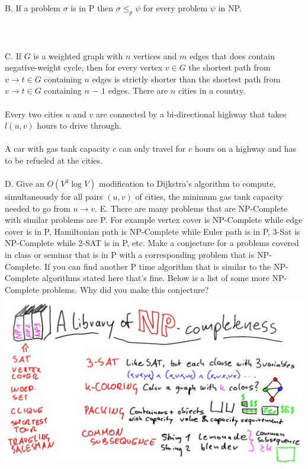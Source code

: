 \documentclass[12pt]{article}
\begin{document}
B. If a problem $\sigma$ is in P then $\sigma \le_p \psi$ for every problem $\psi$ in NP.\\\\\\\\
C. If $G$ is a weighted graph with $n$ vertices and $m$ edges that does contain negative-weight
cycle, then for every vertex $v \in G$ the shortest path from $v \rightarrow t \in G$ containing $n$ edges
is strictly shorter than the shortest path from $v \rightarrow t \in G$ containing $n$ $-$ $1$ edges.
\newpage
\noindent There are $n$ cities in a country.\\\\
Every two cities $u$ and $v$ are connected by a bi-directional highway that takes $l(u,v)$ hours to drive through.\\\\
A car with gas tank capacity $c$ can only travel for $c$ hours on a highway and has to be refueled at the cities.\\\\
D. Give an $O(V^3\log{V})$ modification to Dijkstra’s algorithm to compute, simultaneously for all pairs $(u,v)$ of cities, the minimum gas tank capacity needed to go from $u \rightarrow v$.
\newpage
\noindent E. There are many problems that are NP-Complete with similar problems are P. 
For example vertex cover is NP-Complete while edge cover is in P, Hamiltonian path is NP-Complete 
while Euler path is in P, 3-Sat is NP-Complete while 2-SAT is in P, etc. Make a conjecture for a 
problems covered in class or seminar that is in P with a corresponding problem that is NP-Complete. If you can find 
another P time algorithm that is similar to the NP-Complete algorithms stated here that's 
fine. Below is a list of some more NP-Complete problems. Why did you make this conjecture?\\
\includegraphics[width=\textwidth]{npcomplete.jpg}\\ 
\end{document}
